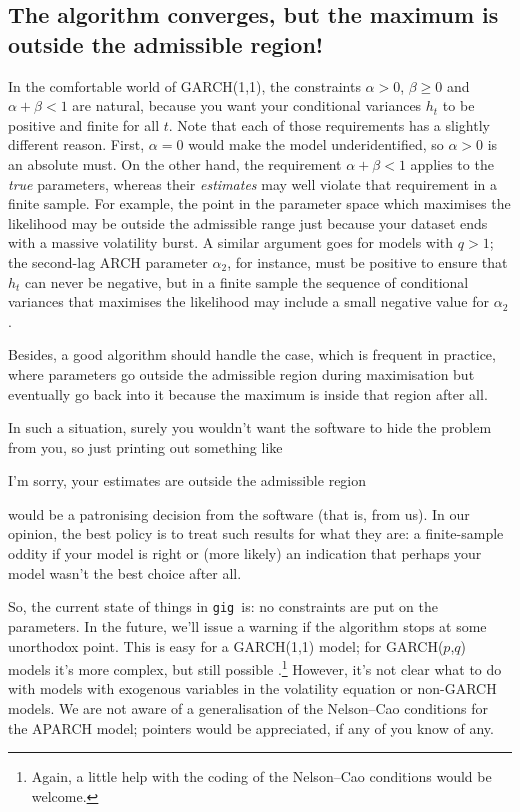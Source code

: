 \documentclass[a4paper,11pt]{article}
\newcommand{\gig}{\texttt{gig}}
\begin{document}
\subsection{The algorithm converges, but the maximum is outside the
  admissible region!}

In the comfortable world of GARCH(1,1), the constraints $\alpha > 0$,
$\beta \ge 0$ and $\alpha + \beta < 1$ are natural, because you want
your conditional variances $h_t$ to be positive and finite for all
$t$. Note that each of those requirements has a slightly different
reason. First, $\alpha = 0$ would make the model underidentified, so
$\alpha > 0$ is an absolute must. On the other hand, the requirement
$\alpha + \beta < 1$ applies to the \emph{true} parameters, whereas
their \emph{estimates} may well violate that requirement in a finite
sample. For example, the point in the parameter space which maximises
the likelihood may be outside the admissible range just because your
dataset ends with a massive volatility burst. A similar argument goes
for models with $q>1$; the second-lag ARCH parameter $\alpha_2$, for
instance, must be positive to ensure that $h_t$ can never be negative,
but in a finite sample the sequence of conditional variances that
maximises the likelihood may include a small negative value for
$\alpha_2$.

Besides, a good algorithm should handle the case, which is frequent in
practice, where parameters go outside the admissible region during
maximisation but eventually go back into it because the maximum is
inside that region after all.

In such a situation, surely you wouldn't want the software to hide the
problem from you, so just printing out something like 
\begin{code}
  I'm sorry, your estimates are outside the admissible region
\end{code}
would be a patronising decision from the software (that is, from
us). In our opinion, the best policy is to treat such results for
what they are: a finite-sample oddity if your model is right or (more
likely) an indication that perhaps your model wasn't the best choice
after all.

So, the current state of things in \gig\ is: no constraints are put on
the parameters. In the future, we'll issue a warning if the algorithm
stops at some unorthodox point. This is easy for a GARCH(1,1) model;
for GARCH($p$,$q$) models it's more complex, but still possible
\citep{NelCao92}.\footnote{Again, a little help with the coding of the
  Nelson--Cao conditions would be welcome.}  However, it's not clear
what to do with models with exogenous variables in the volatility
equation or non-GARCH models. We are not aware of a generalisation of
the Nelson--Cao conditions for the APARCH model; pointers would be
appreciated, if any of you know of any.
\end{document}
